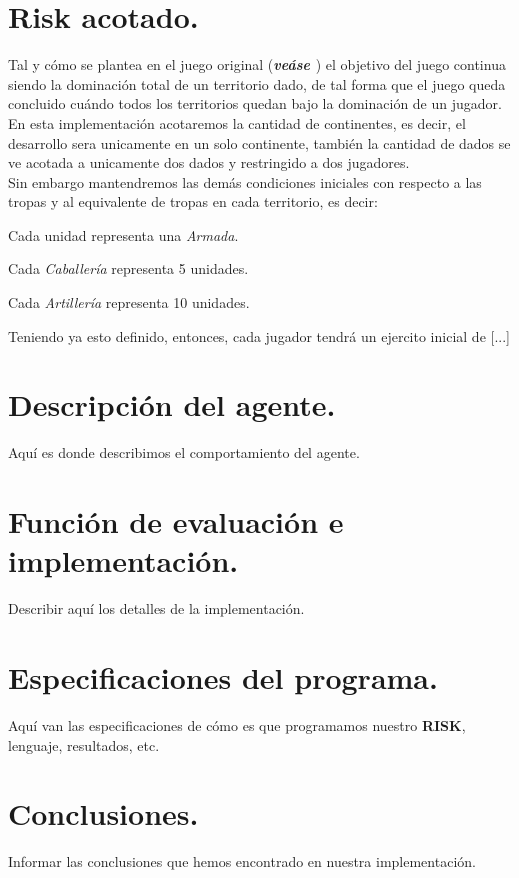 \documentclass[10pt,twocolumn,draft]{article}
\begin{document}
\section{Risk acotado.}

Tal y c\'omo se plantea en el juego original (\textbf{\textit{ve\'ase \cite{RISK}}}) el objetivo del juego continua siendo la dominaci\'on total de un territorio dado, de tal forma
que el juego queda concluido cu\'ando todos los territorios quedan bajo la dominaci\'on de 
un jugador.\\
En esta implementaci\'on acotaremos la cantidad de continentes, es decir, el desarrollo sera unicamente en un solo continente, tambi\'en la cantidad de dados se ve acotada a unicamente dos dados y restringido a dos jugadores.\\

Sin embargo mantendremos las dem\'as condiciones iniciales con respecto a las tropas y al equivalente de tropas en cada territorio, es decir:
\begin{list}{*}{}
\item Cada unidad representa una \textit{Armada}.
\item Cada \textit{Caballer\'ia} representa 5 unidades.
\item Cada \textit{Artiller\'ia} representa 10 unidades.
\end{list}

Teniendo ya esto definido, entonces, cada jugador tendr\'a un ejercito inicial de [...]

\section{Descripci\'on del agente.}
Aqu\'i es donde describimos el comportamiento del agente.


\section{Funci\'on de evaluaci\'on e implementaci\'on.}
Describir aqu\'i los detalles de la implementaci\'on.

\section{Especificaciones del programa.}
Aqu\'i van las especificaciones de c\'omo es que programamos nuestro \textbf{RISK}, lenguaje, resultados, etc.

\section{Conclusiones.}
Informar las conclusiones que hemos encontrado en nuestra implementaci\'on.


\newpage
	
{}
\end{document}
